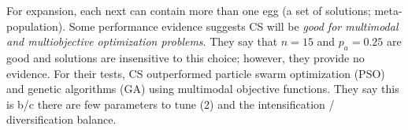 \documentclass[12pt,twoside]{article}
\begin{document}
\begin{itemize}
For expansion, each next can contain more than one egg (a set of solutions; meta-population). Some performance evidence suggests CS will be \textit{good for multimodal and multiobjective optimization problems}. They say that $n=15$ and $p_a=0.25$ are good and solutions are insensitive to this choice; however, they provide no evidence. For their tests, CS outperformed particle swarm optimization (PSO) and genetic algorithms (GA) using multimodal objective functions. They say this is b/c there are few parameters to tune (2) and the intensification / diversification balance. 



\end{itemize}

\end{document}
